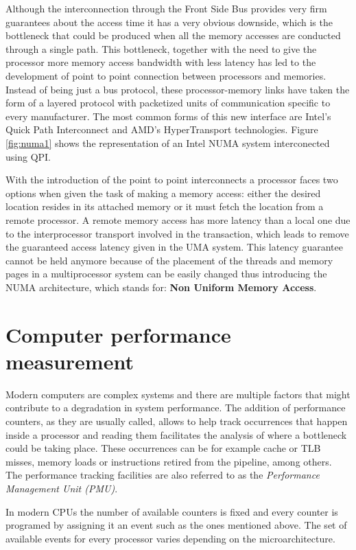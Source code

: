 Although the interconnection through the Front Side Bus provides very firm guarantees about the access time it has a very obvious downside, which is the bottleneck that could be produced when all the memory accesses are conducted through a single path. This bottleneck, together with the need to give the processor more memory access bandwidth with less latency has led to the development of point to point connection between processors and memories. Instead of being just a bus protocol, these processor-memory links have taken the form of a layered protocol with packetized units of communication specific to every manufacturer. The most common forms of this new interface are Intel's Quick Path Interconnect and AMD's HyperTransport technologies. Figure \ref{fig:numa1} shows the representation of an Intel NUMA system interconected using QPI.

With the introduction of the point to point interconnects a processor faces two options when given the task of making a memory access: either the desired location resides in its attached memory or it must fetch the location from a remote processor. A remote memory access has more latency than a local one due to the interprocessor transport involved in the transaction, which leads to remove the guaranteed access latency given in the UMA system. This latency guarantee cannot be held anymore because of the placement of the threads and memory pages in a multiprocessor system can be easily changed thus introducing the NUMA architecture, which stands for: \textbf{Non Uniform Memory Access}. 

\section{Computer performance measurement}\label{section:perfmeas}

Modern computers are complex systems and there are multiple factors that might contribute to a degradation in system performance. The addition of performance counters, as they are usually called, allows to help track occurrences that happen inside a processor and reading them facilitates the analysis of where a bottleneck could be taking place. These occurrences can be for example cache or TLB misses, memory loads or instructions retired from the pipeline, among others. The performance tracking facilities are also referred to as the \textit{Performance Management Unit (PMU)}.

In modern CPUs the number of available counters is fixed and every counter is programed by assigning it an event such as the ones mentioned above. The set of available events for every processor varies depending on the microarchitecture. 

